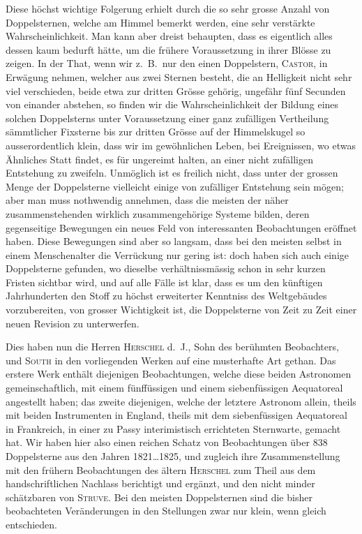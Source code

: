 \documentclass[12pt,a4paper]{article}
\begin{document}
Diese h\"ochst wichtige Folgerung erhielt durch die so sehr grosse Anzahl von Doppelsternen, welche am Himmel bemerkt werden, eine sehr verst\"arkte Wahrscheinlichkeit. Man kann aber dreist behaupten, dass es eigentlich alles dessen kaum bedurft h\"atte, um die fr\"uhere Voraussetzung in ihrer Bl\"osse zu zeigen. In der That, wenn wir z.\ B.\ nur den einen Doppelstern, \textsc{Castor}, in Erw\"agung nehmen, welcher aus zwei Sternen besteht, die an Helligkeit nicht sehr viel verschieden, beide etwa zur dritten Gr\"osse geh\"orig, ungef\"ahr f\"unf Secunden von einander abstehen, so finden wir die Wahrscheinlichkeit der Bildung eines solchen Doppelsterns unter Voraussetzung einer ganz zuf\"alligen Vertheilung s\"ammtlicher Fixsterne bis zur dritten Gr\"osse auf der Himmelskugel so ausserordentlich klein, dass wir im gew\"ohnlichen Leben, bei Ereignissen, wo etwas \"Ahnliches Statt findet, es f\"ur ungereimt halten, an einer nicht zuf\"alligen Entstehung zu zweifeln. Unm\"oglich ist es freilich nicht, dass unter der grossen Menge der Doppelsterne vielleicht einige von zuf\"alliger Entstehung sein m\"ogen; aber man muss nothwendig annehmen, dass die meisten der n\"aher zusammenstehenden wirklich zusammengeh\"orige Systeme bilden, deren gegenseitige Bewegungen ein neues Feld von interessanten Beobachtungen er\"offnet haben. Diese Bewegungen sind aber so langsam, dass bei den meisten selbst in einem Menschenalter die Verr\"uckung nur gering ist: doch haben sich auch einige Doppelsterne gefunden, wo dieselbe verh\"altnissm\"assig schon in sehr kurzen Fristen sichtbar wird, und auf alle F\"alle ist klar, dass es um den k\"unftigen Jahrhunderten den Stoff zu h\"ochst erweiterter Kenntniss des Weltgeb\"audes vorzubereiten, von grosser Wichtigkeit ist, die Doppelsterne von Zeit zu Zeit einer neuen Revision zu unterwerfen.

Dies haben nun die Herren \textsc{Herschel} d.\ J., Sohn des ber\"uhmten Beobachters, und \textsc{South} in den vorliegenden Werken auf eine musterhafte Art gethan. Das erstere Werk enth\"alt diejenigen Beobachtungen, welche diese beiden Astronomen gemeinschaftlich, mit einem f\"unff\"ussigen und einem siebenf\"ussigen Aequatoreal angestellt haben; das zweite diejenigen, welche der letztere Astronom allein, theils mit beiden Instrumenten in England, theils mit dem siebenf\"ussigen Aequatoreal in Frankreich, in einer zu Passy interimistisch errichteten Sternwarte, gemacht hat. Wir haben hier also einen reichen Schatz von Beobachtungen \"uber 838 Doppelsterne aus den Jahren 1821\dots 1825, und zugleich ihre Zusammenstellung mit den fr\"uhern Beobachtungen des \"altern \textsc{Herschel} zum Theil aus dem handschriftlichen Nachlass berichtigt und erg\"anzt, und den nicht minder sch\"atzbaren von \textsc{Struve}. Bei den meisten Doppelsternen sind die bisher beobachteten Ver\"anderungen in den Stellungen zwar nur klein, wenn gleich entschieden.
\end{document}
